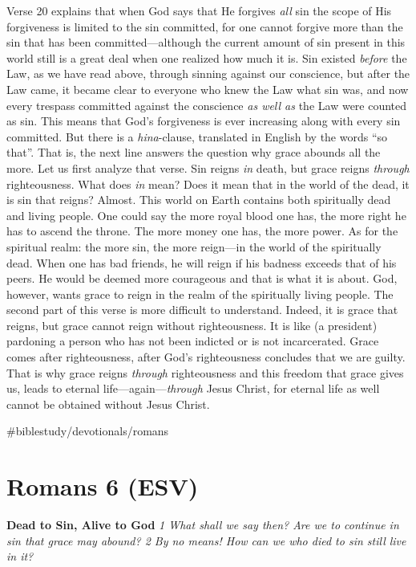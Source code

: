 Verse 20 explains that when God says that He forgives \emph{all} sin the
scope of His forgiveness is limited to the sin committed, for one cannot
forgive more than the sin that has been committed---although the current
amount of sin present in this world still is a great deal when one
realized how much it is. Sin existed \emph{before} the Law, as we have
read above, through sinning against our conscience, but after the Law
came, it became clear to everyone who knew the Law what sin was, and now
every trespass committed against the conscience \emph{as well as} the
Law were counted as sin. This means that God's forgiveness is ever
increasing along with every sin committed. But there is a
\emph{hina}-clause, translated in English by the words ``so that''. That
is, the next line answers the question why grace abounds all the more.
Let us first analyze that verse. Sin reigns \emph{in} death, but grace
reigns \emph{through} righteousness. What does \emph{in} mean? Does it
mean that in the world of the dead, it is sin that reigns? Almost. This
world on Earth contains both spiritually dead and living people. One
could say the more royal blood one has, the more right he has to ascend
the throne. The more money one has, the more power. As for the spiritual
realm: the more sin, the more reign---in the world of the spiritually
dead. When one has bad friends, he will reign if his badness exceeds
that of his peers. He would be deemed more courageous and that is what
it is about. God, however, wants grace to reign in the realm of the
spiritually living people. The second part of this verse is more
difficult to understand. Indeed, it is grace that reigns, but grace
cannot reign without righteousness. It is like (a president) pardoning a
person who has not been indicted or is not incarcerated. Grace comes
after righteousness, after God's righteousness concludes that we are
guilty. That is why grace reigns \emph{through} righteousness and this
freedom that grace gives us, leads to eternal
life---again---\emph{through} Jesus Christ, for eternal life as well
cannot be obtained without Jesus Christ.

\#biblestudy/devotionals/romans

\hypertarget{romans-6-esv}{%
\section{Romans 6 (ESV)}\label{romans-6-esv}}

\textbf{Dead to Sin, Alive to God} \emph{1 What shall we say then? Are
we to continue in sin that grace may abound? 2 By no means! How can we
who died to sin still live in it?}

